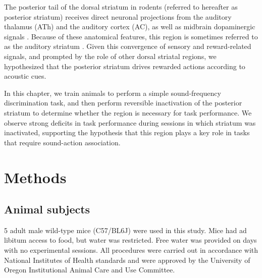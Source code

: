 The posterior tail of the dorsal striatum in rodents (referred to hereafter as posterior striatum) receives direct neuronal projections from the auditory thalamus (ATh) and the auditory cortex (AC), as well as midbrain dopaminergic signals \citep{Menegas2015, Hunnicutt2016}.
%
Because of these anatomical features, this region is sometimes referred to as the auditory striatum \citep{Znamenskiy2013}.
%
Given this convergence of sensory and reward-related signals, and prompted by the role of other dorsal striatal regions, we hypothesized that the posterior striatum drives rewarded actions according to acoustic cues.

In this chapter, we train animals to perform a simple sound-frequency discrimination task, and then perform reversible inactivation of the posterior striatum to determine whether the region is necessary for task performance.
%
We observe strong deficits in task performance during sessions in which striatum was inactivated, supporting the hypothesis that this region plays a key role in tasks that require sound-action association.

\section{Methods}

\subsection{Animal subjects}
5 adult male wild-type mice (C57/BL6J) were used in this study. Mice had ad libitum access to food, but water was restricted. Free water was provided on days with no experimental sessions. All procedures were carried out in accordance with National Institutes of Health standards and were approved by the University of Oregon Institutional Animal Care and Use Committee.

